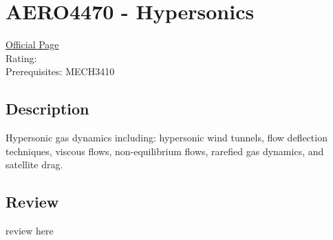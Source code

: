 \hypertarget{AERO4470}{\section{AERO4470 - Hypersonics}}

\large
\textcolor{turbo_purple}{\href{https://my.uq.edu.au/programs-courses/course.html?course_code=AERO4470}{Official Page}} \\
Rating: \cstar\cstar\cstar\cstar\ostar \\
Prerequisites: MECH3410

\normalsize
\subsection*{Description}
Hypersonic gas dynamics including: hypersonic wind tunnels, flow deflection techniques, viscous flows, non-equilibrium flows, rarefied gas dynamics, and satellite drag.

\subsection*{Review}
review here
